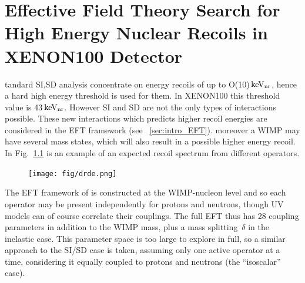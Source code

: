 %
%
\let\textcircled=\pgftextcircled
\chapter{Effective Field Theory Search for High Energy Nuclear Recoils in XENON100 Detector}
\label{chap:EFT}

tandard SI,SD analysis concentrate on energy recoils of up to O(10)\,$\mathrm{keV_\mathrm{nr}}$, hence a hard high energy threshold is used for them. In XENON100 this threshold value is 43\,$\mathrm{keV_\mathrm{nr}}$. However SI and SD are not the only types of interactions possible. These new interactions which predicts higher recoil energies are considered in the EFT framework (see ~\ref{sec:intro_EFT}). moreover a WIMP may have several mass states, which will also result in a possible higher energy recoil. In Fig.~\ref{fig:EFTdrde} is an example of an expected recoil spectrum from different operators. 

\begin{figure}[t!]
	\centering
	\texttt{[image: fig/drde.png]}
	\label{fig:EFTdrde}
\end{figure}

	    
The EFT framework of \cite{Fitzpatrick:2012ib} is constructed at the WIMP-nucleon level and so each operator may be present independently for protons and neutrons, though UV models can of course correlate their couplings. The full EFT thus has 28 coupling parameters in addition to the WIMP mass, plus a mass splitting~$\delta$ in the inelastic case. This parameter space is too large to explore in full, so a similar approach to the SI/SD case is taken, assuming only one active operator at a time, considering it equally coupled to protons and neutrons (the ``isoscalar'' case). 

